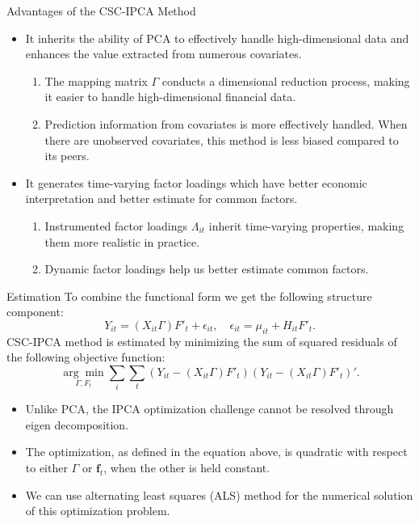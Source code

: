 \documentclass{beamer}
\begin{document}
\begin{frame}{Advantages of the CSC-IPCA Method}
    \begin{itemize}
        \item It inherits the ability of PCA to effectively handle high-dimensional data and enhances the value extracted from numerous covariates.
        \begin{enumerate}
            \item The mapping matrix $\Gamma$ conducts a dimensional reduction process, making it easier to handle high-dimensional financial data.
            \item Prediction information from covariates is more effectively handled. When there are unobserved covariates, this method is less biased compared to its peers.
        \end{enumerate}

        \item It generates time-varying factor loadings which have better economic interpretation and better estimate for common factors.
        \begin{enumerate}
            \item Instrumented factor loadings $\Lambda_{it}$ inherit time-varying properties, making them more realistic in practice.
            \item Dynamic factor loadings help us better estimate common factors.
        \end{enumerate}
    \end{itemize}
\end{frame}

\begin{frame}{Estimation}
To combine the functional form we get the following structure component:
$$
Y_{it} = (X_{it}\Gamma) F'_{t} + \epsilon_{it}, \quad \epsilon_{it} = \mu_{it} + H_{it} F'_t.
$$
CSC-IPCA method is estimated by minimizing the sum of squared residuals of the following objective function:
$$
\underset{\Gamma, F_t}{\arg\min} \sum_{i} \sum_{t}\left( Y_{it} -(X_{it}\Gamma) F'_{t} \right)\left( Y_{it} - (X_{it}\Gamma) F'_{t}\right)'.
$$
\begin{itemize}
    \item Unlike PCA, the IPCA optimization challenge cannot be resolved through eigen decomposition.
    \item The optimization, as defined in the equation above, is quadratic with respect to either $\Gamma$ or $\boldsymbol{f}_t$, when the other is held constant.
    \item We can use alternating least squares (ALS) method for the numerical solution of this optimization problem.
\end{itemize}
\end{frame}
\end{document}
